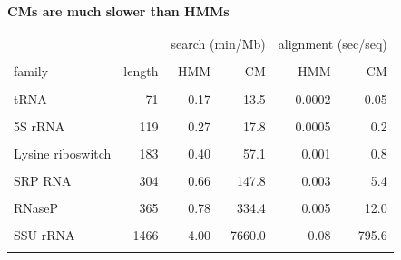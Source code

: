 \documentclass[landscape]{slides}
\begin{document}
\begin{slide}
\begin{center}
\end{center}

\vfill

\end{slide}
\begin{slide}
\begin{center}
\textbf{CMs are much slower than HMMs}
\end{center}
\medskip

\begin{center}
\small
\begin{tabular}{lr|rr|rr}
                  &        & \multicolumn{2}{c|}{search (min/Mb)} &   \multicolumn{2}{c}{alignment (sec/seq)}\\ \cline{3-6}
                  &        &        &        &         &  \\
family            & length & HMM    & CM     &    HMM  & CM  \\ \hline
                  &        &        &        &         &  \\
tRNA              & 71     &  0.17 &  13.5 &  0.0002&   0.05  \\
                  &        &        &        &         &  \\
5S rRNA           & 119    &  0.27 &  17.8 &  0.0005&   0.2  \\
                  &        &        &        &        &  \\
Lysine riboswitch & 183    &  0.40  & 57.1 &  0.001 &   0.8 \\
                  &        &        &        &         &  \\
SRP RNA           & 304    &  0.66  & 147.8 &  0.003 &   5.4 \\
                  &        &        &        &         &  \\
RNaseP            & 365    &  0.78 & 334.4 &  0.005 &  12.0 \\
                  &        &        &        &         &  \\
SSU rRNA          & 1466   &  4.00 & 7660.0&  0.08  & 795.6 \\
                  &        &        &        &         &  \\
\end{tabular}
\end{center}

\vfill

\end{slide}
\end{document}
